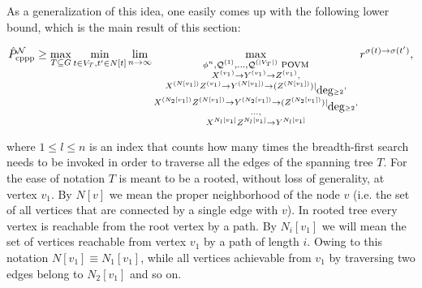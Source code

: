 \documentclass[aps,pra,twocolumn,superscriptaddress,longbibliography]{revtex4-1}
\newcommand{\mc}[1]{\mathcal{#1}}
\begin{document}
As a generalization of this idea, one easily comes up with the following lower bound, which is the main result of this section:
\begin{widetext}
 \begin{align}
    \hat{P}_{\textnormal{cppp}}^{\mc{N}}\geq\max_{T\subseteq G}\min_{t\in V_T,t'\in N[t]} \lim_{n\to\infty}
    \max_{\substack{\phi^n,\mc{Q}^{(1)},...,\mc{Q}^{(|V_T|)}\text{ POVM} \\X^{(v_1)}\to Y^{(v_1)}\to Z^{(v_1)},\\
        X^{(N[v_1])}Z^{(v_1)}\to Y^{(N[v_1])} \to (Z^{(N[v_1])})|_{\mbox{deg}\geq 2},\\
        X^{(N_2[v_1])}Z^{(N[v_1])} \to Y^{(N_2[v_1])}\to (Z^{(N_2[v_1])})|_{\mbox{deg}\geq 2},\\
            ...,\\
            X^{N_l[v_1]}Z^{N_l[v_1]} \to Y^{N_l[v_1]} 
        }}  r^{\sigma(t) \to \sigma(t')},
    \label{eq:lb-general}
    \end{align}
\end{widetext}
    where $1\leq l\leq n$ is an index that counts how many times the breadth-first search needs to be invoked in order to traverse all the edges of the spanning tree $T$.
    For the ease of notation $T$ is meant to be a rooted, without loss of generality, at vertex $v_1$.
    By $N[v]$ we mean the proper neighborhood of the node $v$ (i.e. the set of all vertices that are connected by a single edge with $v$). %
    In rooted tree every vertex is reachable from the root vertex
    by a path. By $N_i[v_1]$ we will
    mean the set of vertices reachable from vertex $v_1$ by a path of length $i$. Owing to this notation $N[v_1]\equiv N_1[v_1]$, while
    all vertices achievable from $v_1$ by traversing two edges belong to
    $N_2[v_1]$ and so on.
     
\end{document}

